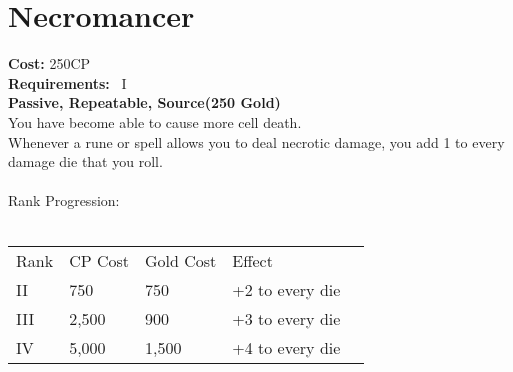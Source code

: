 \section{Necromancer}\label{perk:necromancer}
\textbf{Cost:} 250CP\\
\textbf{Requirements:}~ I\\
\textbf{Passive, Repeatable, Source(250 Gold)}\\
You have become able to cause more cell death.\\
Whenever a rune or spell allows you to deal necrotic damage, you add 1 to every damage die that you roll.\\
\\
Rank Progression:\\
\\
\begin{tabular}{l | l | l | l | l}
    Rank & CP Cost & Gold Cost &  Effect\\
    II & 750 & 750 & +2 to every die\\
    III & 2,500 & 900 & +3 to every die\\
    IV & 5,000 & 1,500 & +4 to every die\\
\end{tabular}